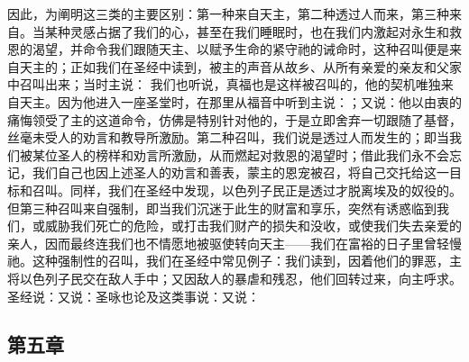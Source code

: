 因此，为阐明这三类的主要区别：第一种来自天主，第二种透过人而来，第三种来自。当某种灵感占据了我们的心，甚至在我们睡眠时，也在我们内激起对永生和救恩的渴望，并命令我们跟随天主、以赋予生命的紧守祂的诫命时，这种召叫便是来自天主的；正如我们在圣经中读到，被主的声音从故乡、从所有亲爱的亲友和父家中召叫出来；当时主说： 我们也听说，真福也是这样被召叫的，他的契机唯独来自天主。因为他进入一座圣堂时，在那里从福音中听到主说：；又说：他以由衷的痛悔领受了主的这道命令，仿佛是特别针对他的，于是立即舍弃一切跟随了基督，丝毫未受人的劝言和教导所激励。第二种召叫，我们说是透过人而发生的；即当我们被某位圣人的榜样和劝言所激励，从而燃起对救恩的渴望时；借此我们永不会忘记，我们自己也因上述圣人的劝言和善表，蒙主的恩宠被召，将自己交托给这一目标和召叫。同样，我们在圣经中发现，以色列子民正是透过才脱离埃及的奴役的。但第三种召叫来自强制，即当我们沉迷于此生的财富和享乐，突然有诱惑临到我们，或威胁我们死亡的危险，或打击我们财产的损失和没收，或使我们失去亲爱的亲人，因而最终连我们也不情愿地被驱使转向天主——我们在富裕的日子里曾轻慢祂。这种强制性的召叫，我们在圣经中常见例子：我们读到，因着他们的罪恶，主将以色列子民交在敌人手中；又因敌人的暴虐和残忍，他们回转过来，向主呼求。圣经说：又说：圣咏也论及这类事说：又说：\par


\subsection{第五章}

\par

